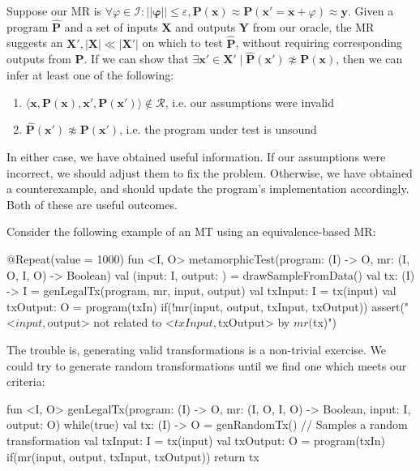 \documentclass[12pt,initial,twoside,maitrise]{dms}
\numberwithin{equation}{section}
\numberwithin{table}{chapter}
\numberwithin{figure}{chapter}
\begin{document}
Suppose our MR is $\forall \varphi \in \mathcal I: ||\mathbf\varphi|| \leq \varepsilon, \mathbf P(\mathbf x) \approx \mathbf P(\mathbf x' = \mathbf x + \varphi) \approx \mathbf y$. Given a program $\mathbf{\hat P}$ and a set of inputs $\mathbf X$ and outputs $\mathbf Y$ from our oracle, the MR suggests an $\mathbf X', |\mathbf X| \ll |\mathbf X'|$ on which to test $\mathbf{\hat P}$, without requiring corresponding outputs from $\mathbf P$. If we can show that $\exists \mathbf x' \in \mathbf X' \mid \mathbf{\hat P}(\mathbf x') \not\approx \mathbf P(\mathbf x)$, then we can infer at least one of the following:

\begin{enumerate}
\item $\langle \mathbf x, \mathbf P(\mathbf x), \mathbf x', \mathbf P(\mathbf x')\rangle \notin \mathcal R$, i.e. our assumptions were invalid
\item $\mathbf{\hat P}(\mathbf x') \not\approx \mathbf{P}(\mathbf x')$, i.e. the program under test is unsound
\end{enumerate}
%
In either case, we have obtained useful information. If our assumptions were incorrect, we should adjust them to fix the problem. Otherwise, we have obtained a counterexample, and should update the program's implementation accordingly. Both of these are useful outcomes.

Consider the following example of an MT using an equivalence-based MR:

\begin{kotlinlisting}
@Repeat(value = 1000)
fun <I, O> metamorphicTest(program: (I) -> O, mr: (I, O, I, O) -> Boolean) {
    val (input: I, output: ) = drawSampleFromData()
    val tx: (I) -> I = genLegalTx(program, mr, input, output)
    val txInput: I = tx(input)
    val txOutput: O = program(txIn)
    if(!mr(input, output, txInput, txOutput))
        assert("<$input, $output> not related to <$txInput, $txOutput> by $mr ($tx)")
}
\end{kotlinlisting}
%
The trouble is, generating valid transformations is a non-trivial exercise. We could try to generate random transformations until we find one which meets our criteria:
%
\begin{kotlinlisting}
fun <I, O> genLegalTx(program: (I) -> O, mr: (I, O, I, O) -> Boolean, input: I, output: O) {
    while(true) {
        val tx: (I) -> O = genRandomTx() // Samples a random transformation
        val txInput: I = tx(input)
        val txOutput: O = program(txIn)
        if(mr(input, output, txInput, txOutput)) return tx
    }
}
\end{kotlinlisting}
\end{document}
